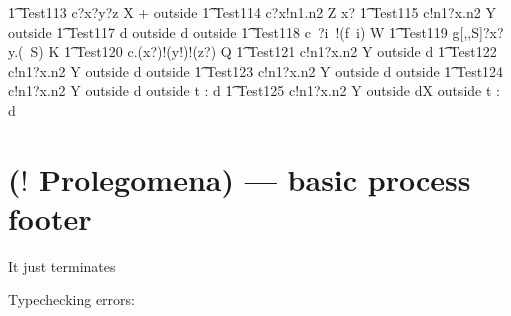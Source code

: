 \documentclass{article}
\begin{document}
%
\begin{circusaction}
   \t1 Test113 \circdef c?x?y?z \circat X \then {} + outside \rcirctime \Skip
   \also
   \t1 Test114 \circdef c?x!n1.n2 \circat Z \then \lcirctime x? \rcirctime \Skip 
   \also
   \t1 Test115 \circdef c!n1?x.n2 \circat Y \then \lcirctime outside \rcirctime \Skip
   \also
   \t1 Test117 \circdef d \then \lcirctime outside \rcirctime d \then \lcirctime outside \rcirctime \Skip 
   \also
   \t1 Test118 \circdef c~?i~!(f~i) \circat W \then \Skip
       \also
   \t1 Test119 \circdef g[\nat,\nat,S]?x?y.(\theta~S) \circat K \then \Skip
       \also
   \t1 Test120 \circdef c.(x?)!(y!)!(z?) \circat Q \then {} \rcirctime \Skip 
   \also
   \t1 Test121 \circdef c!n1?x.n2 \circat Y \then \lcirctime outside \rcirctime d \then \Skip
   \also
   \t1 Test122 \circdef c!n1?x.n2 \circat Y \then \lcirctime outside \rcirctime d \then \lcirctime 
   outside \rcirctime \Skip
   \also
   \t1 Test123 \circdef c!n1?x.n2 \circat Y \then \lcirctime outside \rcirctime d \then \lcirctime 
   outside \rcirctime {} \rcirctime \circstartby {}
   \also
   \t1 Test124 \circdef c!n1?x.n2 \circat Y \then \lcirctime outside \rcirctime d \then \lcirctime 
   outside \rcirctime {} \rcirctime \circstartby \circwait t : \nat \circspot d \then 
   \Skip   
   \also
   \t1 Test125 \circdef c!n1?x.n2 \circat Y \then \lcirctime outside \rcirctime d\circat X \then 
   \lcirctime outside \rcirctime {} \rcirctime \circstartby \circwait t : \nat 
   \circspot d \then \Skip

\end{circusaction}    

\newpage
\section{($!$ Prolegomena) --- basic process footer}

It just terminates

\begin{circusaction}
   \circspot \Skip
\end{circusaction}

\begin{circus}
   \circend
\end{circus}


Typechecking  errors:
\end{document}
